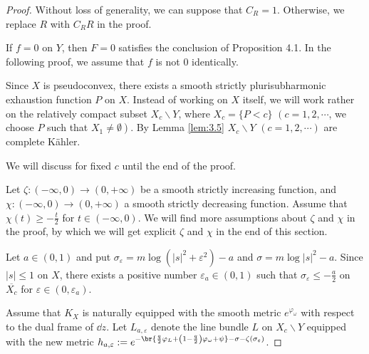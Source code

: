 \documentclass[lang=en,12pt,twoside]{textbook}
\begin{document}
\begin{proof}
Without loss of generality, we can suppose that $C_R=1$. Otherwise, we replace $R$ with $C_R R$ in the proof.

If $f=0$ on $Y$, then $F=0$ satisfies the conclusion of Proposition 4.1. In the following proof, we assume that $f$ is not 0 identically.

Since $X$ is pseudoconvex, there exists a smooth strictly plurisubharmonic exhaustion function $P$ on $X$. Instead of working on $X$ itself, we will work rather on the relatively compact subset $X_c \backslash Y$, where $X_c=\{P<c\}$ $\left(c=1,2, \cdots\right.$, we choose $P$ such that $\left.X_1 \neq \emptyset\right)$. By Lemma \ref{lem:3.5} $X_c \backslash Y$ $(c=1,2, \cdots)$ are complete Kähler.

We will discuss for fixed $c$ until the end of the proof.


Let $\zeta:(-\infty, 0) \longrightarrow(0,+\infty)$ be a smooth strictly increasing function, and $\chi:(-\infty, 0) \longrightarrow(0,+\infty)$ a smooth strictly decreasing function. Assume that $\chi(t) \geq-\frac{t}{2}$ for $t \in(-\infty, 0)$. We will find more assumptions about $\zeta$ and $\chi$ in the proof, by which we will get explicit $\zeta$ and $\chi$ in the end of this section.

Let $a \in(0,1)$ and put $\sigma_{\varepsilon}=m \log \left(|s|^2+\varepsilon^2\right)-a$ and $\sigma=m \log |s|^2-a$. Since $|s| \leq 1$ on $X$, there exists a positive number $\varepsilon_a \in(0,1)$ such that $\sigma_{\varepsilon} \leq-\frac{a}{2}$ on $\overline{X_c}$ for $\varepsilon \in\left(0, \varepsilon_a\right)$.

Assume that $K_X$ is naturally equipped with the smooth metric $e^{\varphi_\omega}$ with respect to the dual frame of $\dd z$. 
Let $L_{a, \varepsilon}$  denote the line bundle $L$ on $X_c \backslash Y$ equipped with the new metric $h_{a, \varepsilon}:=e^{-\br{\frac{q}{2}\varphi_L+\left(1-\frac{q}{2}\right)\varphi_\omega+\psi}-\sigma-\zeta\left(\sigma_{\varepsilon}\right)}$.


\end{proof}
\end{document}
